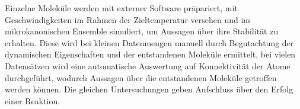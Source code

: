 Einzelne Moleküle werden mit externer Software präpariert, mit Geschwindigkeiten im Rahmen der Zieltemperatur versehen und im mikrokanonischen Ensemble simuliert, um Aussagen über ihre Stabilität zu erhalten.
Diese wird bei kleinen Datenmengen manuell durch Begutachtung der dynamischen Eigenschaften und der entstandenen Moleküle ermittelt, bei vielen Datensätzen wird eine automatische Auswertung auf Konnektivität der Atome durchgeführt, wodurch Aussagen über die entstandenen Moleküle getroffen werden können.
Die gleichen Untersuchungen geben Aufschluss über den Erfolg einer Reaktion.
